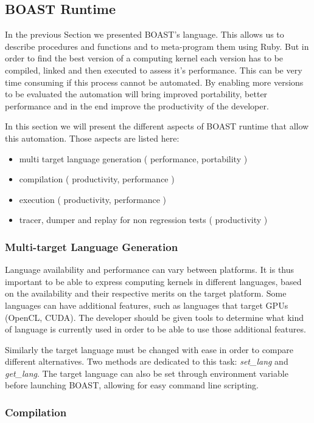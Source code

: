 \documentclass[11pt, a4paper, twoside]{montblanc}
\begin{document}
\subsection{BOAST Runtime}

In the previous Section we presented BOAST's language. This allows us to
describe procedures and functions and to meta-program them using Ruby. But in
order to find the best version of a computing kernel each version has to be
compiled, linked and then executed to assess it's performance. This can be very
time consuming if this process cannot be automated. By enabling more versions to
be evaluated the automation will bring improved portability, better performance
and in the end improve the productivity of the developer.

In this section we will present the different aspects of BOAST runtime that
allow this automation. Those aspects are listed here:
  \begin{itemize}
  \item multi target language generation ( performance, portability )
  \item compilation ( productivity, performance )
  \item execution ( productivity, performance )
  \item tracer, dumper and replay for non regression tests ( productivity )
  \end{itemize}

  \subsubsection{Multi-target Language Generation}
\label{sec:multitarget}
Language availability and performance can vary between platforms. It is thus
important to be able to express computing kernels in different languages, based
on the availability and their respective merits on the target platform. Some
languages can have additional features, such as languages that target GPUs
(OpenCL, CUDA). The developer should be given tools to determine what kind of
language is currently used in order to be able to use those additional features.

Similarly the target language must be changed with ease in order to compare
different alternatives. Two methods are dedicated to this task: \emph{set\_lang}
and \emph{get\_lang}. The target language can also be set through environment
variable before launching BOAST, allowing for easy command line scripting.

  \subsubsection{Compilation}
\end{document}
